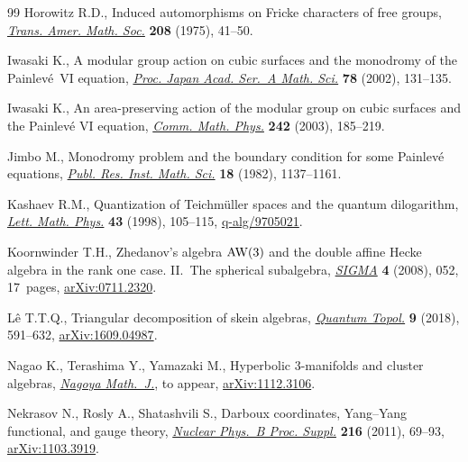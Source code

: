 \begin{thebibliography}{99}
Horowitz R.D., Induced automorphisms on {F}ricke characters of free groups,
 \href{https://doi.org/10.2307/1997274}{\textit{Trans. Amer. Math. Soc.}} \textbf{208} (1975), 41--50.

Iwasaki K., A modular group action on cubic surfaces and the monodromy of the
 {P}ainlev\'{e}~{VI} equation, \href{https://doi.org/10.3792/pjaa.78.131}{\textit{Proc. Japan Acad. Ser.~A Math. Sci.}}
 \textbf{78} (2002), 131--135.

Iwasaki K., An area-preserving action of the modular group on cubic surfaces
 and the {P}ainlev\'{e} {VI} equation, \href{https://doi.org/10.1007/s00220-003-0940-3}{\textit{Comm. Math. Phys.}} \textbf{242}
 (2003), 185--219.

Jimbo M., Monodromy problem and the boundary condition for some {P}ainlev\'{e}
 equations, \href{https://doi.org/10.2977/prims/1195183300}{\textit{Publ. Res. Inst. Math. Sci.}} \textbf{18} (1982),
 1137--1161.

Kashaev R.M., Quantization of {T}eichm\"{u}ller spaces and the quantum
 dilogarithm, \href{https://doi.org/10.1023/A:1007460128279}{\textit{Lett. Math. Phys.}} \textbf{43} (1998), 105--115,
 \href{https://arxiv.org/abs/q-alg/9705021}{q-alg/9705021}.

Koornwinder T.H., Zhedanov's algebra {$\rm AW(3)$} and the double affine
 {H}ecke algebra in the rank one case. {II}.~{T}he spherical subalgebra,
 \href{https://doi.org/10.3842/SIGMA.2008.052}{\textit{SIGMA}} \textbf{4} (2008), 052, 17~pages, \href{https://arxiv.org/abs/0711.2320}{arXiv:0711.2320}.

L\^{e} T.T.Q., Triangular decomposition of skein algebras, \href{https://doi.org/10.4171/QT/115}{\textit{Quantum
 Topol.}} \textbf{9} (2018), 591--632, \href{https://arxiv.org/abs/1609.04987}{arXiv:1609.04987}.

Nagao K., Terashima Y., Yamazaki M., Hyperbolic 3-manifolds and cluster
 algebras, \href{https://doi.org/10.1017/nmj.2017.39}{\textit{Nagoya Math.~J.}}, {t}o appear, \href{https://arxiv.org/abs/1112.3106}{arXiv:1112.3106}.

Nekrasov N., Rosly A., Shatashvili S., Darboux coordinates, {Y}ang--{Y}ang
 functional, and gauge theory, \href{https://doi.org/10.1016/j.nuclphysbps.2011.04.150}{\textit{Nuclear Phys.~B Proc. Suppl.}}
 \textbf{216} (2011), 69--93, \href{https://arxiv.org/abs/1103.3919}{arXiv:1103.3919}.


\end{thebibliography}
